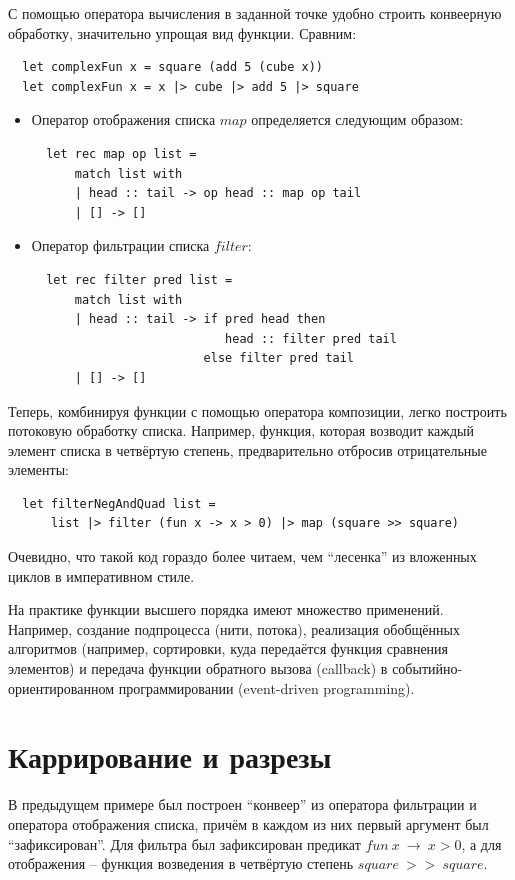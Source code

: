 \documentclass[a4paper,11pt]{article}
\begin{document}
С помощью оператора вычисления в заданной точке удобно строить конвеерную
обработку, значительно упрощая вид функции. Сравним:
\begin{lstlisting}
  let complexFun x = square (add 5 (cube x))
  let complexFun x = x |> cube |> add 5 |> square
\end{lstlisting}

\begin{itemize}
\item Оператор отображения списка $map$ определяется следующим образом:
\begin{lstlisting}
  let rec map op list =
      match list with
      | head :: tail -> op head :: map op tail
      | [] -> []
\end{lstlisting}

\item Оператор фильтрации списка $filter$:
\begin{lstlisting}
  let rec filter pred list =
      match list with
      | head :: tail -> if pred head then
                           head :: filter pred tail
                        else filter pred tail
      | [] -> []
\end{lstlisting}
\end{itemize}

Теперь, комбинируя функции с помощью оператора композиции, легко построить
потоковую обработку списка. Например, функция, которая возводит каждый
элемент списка в четвёртую степень, предварительно отбросив отрицательные
элементы:
\begin{lstlisting}
  let filterNegAndQuad list = 
      list |> filter (fun x -> x > 0) |> map (square >> square)
\end{lstlisting}

Очевидно, что такой код гораздо более читаем, чем ``лесенка'' из вложенных
циклов в императивном стиле.

На практике функции высшего порядка имеют множество применений. Например, 
создание подпроцесса (нити, потока), реализация обобщённых алгоритмов
(например, сортировки, куда передаётся функция сравнения элементов) и
передача функции обратного вызова (callback) в событийно-ориентированном
программировании (event-driven programming).

\section{Каррирование и разрезы}
В предыдущем примере был построен ``конвеер'' из оператора фильтрации и
оператора отображения списка, причём в каждом из них первый аргумент был 
``зафиксирован''. Для фильтра был зафиксирован предикат 
$fun~x~\rightarrow~x > 0$, а для отображения -- функция возведения в
четвёртую степень $square~>>~square$.
\end{document}
